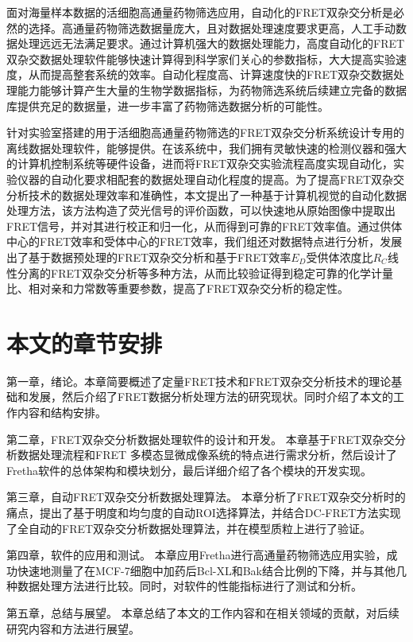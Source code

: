 面对海量样本数据的活细胞高通量药物筛选应用，自动化的FRET双杂交分析是必然的选择。高通量药物筛选数据量庞大，且对数据处理速度要求更高，人工手动数据处理远远无法满足要求。通过计算机强大的数据处理能力，高度自动化的FRET双杂交数据处理软件能够快速计算得到科学家们关心的参数指标，大大提高实验速度，从而提高整套系统的效率。自动化程度高、计算速度快的FRET双杂交数据处理能力能够计算产生大量的生物学数据指标，为药物筛选系统后续建立完备的数据库提供充足的数据量，进一步丰富了药物筛选数据分析的可能性。

针对实验室搭建的用于活细胞高通量药物筛选的FRET双杂交分析系统设计专用的离线数据处理软件，能够提供。在该系统中，我们拥有灵敏快速的检测仪器和强大的计算机控制系统等硬件设备，进而将FRET双杂交实验流程高度实现自动化，实验仪器的自动化要求相配套的数据处理自动化程度的提高。为了提高FRET双杂交分析技术的数据处理效率和准确性，本文提出了一种基于计算机视觉的自动化数据处理方法，该方法构造了荧光信号的评价函数，可以快速地从原始图像中提取出FRET信号，并对其进行校正和归一化，从而得到可靠的FRET效率值。通过供体中心的FRET效率和受体中心的FRET效率，我们组还对数据特点进行分析，发展出了基于数据预处理的FRET双杂交分析和基于FRET效率$E_D$受供体浓度比$R_C$线性分离的FRET双杂交分析等多种方法，从而比较验证得到稳定可靠的化学计量比、相对亲和力常数等重要参数，提高了FRET双杂交分析的稳定性。
\fi

\section{本文的章节安排}

\ifshowtext
第一章，绪论。本章简要概述了定量FRET技术和FRET双杂交分析技术的理论基础和发展，然后介绍了FRET数据分析处理方法的研究现状。同时介绍了本文的工作内容和结构安排。

第二章，FRET双杂交分析数据处理软件的设计和开发。
本章基于FRET双杂交分析数据处理流程和FRET 多模态显微成像系统的特点进行需求分析，然后设计了Fretha软件的总体架构和模块划分，最后详细介绍了各个模块的开发实现。

第三章，自动FRET双杂交分析数据处理算法。
本章分析了FRET双杂交分析时的痛点，提出了基于明度和均匀度的自动ROI选择算法，并结合DC-FRET方法实现了全自动的FRET双杂交分析数据处理算法，并在模型质粒上进行了验证。

第四章，软件的应用和测试。
本章应用Fretha进行高通量药物筛选应用实验，成功快速地测量了在MCF-7细胞中加药后Bcl-XL和Bak结合比例的下降，并与其他几种数据处理方法进行比较。同时，对软件的性能指标进行了测试和分析。

第五章，总结与展望。
本章总结了本文的工作内容和在相关领域的贡献，对后续研究内容和方法进行展望。
\fi

